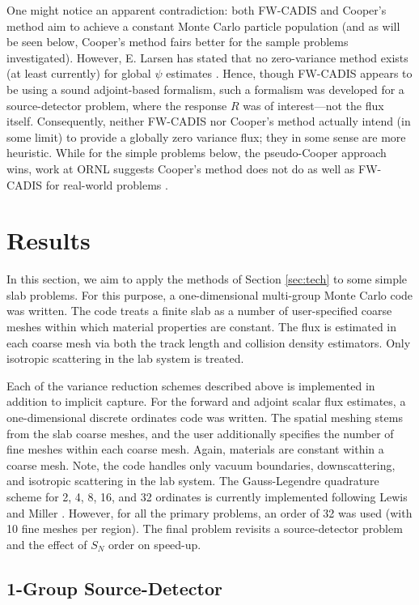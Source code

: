One might notice an apparent contradiction: both FW-CADIS and Cooper's method
aim to achieve a constant Monte Carlo particle population (and as will be seen
below, Cooper's method fairs better for the sample problems investigated). 
However, E. Larsen has stated that no zero-variance method exists (at least
currently) for global $\psi$ estimates \cite{larsen2007hmc}.  Hence, though
FW-CADIS appears to be using a sound adjoint-based formalism, such a formalism
was developed for a source-detector problem, where the response $R$ was of
interest---not the flux itself.  Consequently, neither FW-CADIS nor Cooper's
method actually intend (in some limit) to provide a globally zero variance flux;
they in some sense are more heuristic.  While for the simple problems below, the
pseudo-Cooper approach wins, work at ORNL suggests Cooper's method does not do
as well as FW-CADIS for real-world problems \cite{wagner2009fwc}.

\section{Results}
\label{sec:results}
In this section, we aim to apply the methods of Section \ref{sec:tech} to some
simple slab problems.  For this purpose, a one-dimensional multi-group Monte
Carlo code was written.  The code treats a finite slab as a number of
user-specified coarse meshes within which material properties are constant.  The
flux is estimated in each coarse mesh via both the track length and collision
density estimators.  Only isotropic scattering in the lab system is treated.

Each of the variance reduction schemes described above is implemented in
addition to implicit capture.  For the forward and adjoint scalar flux
estimates, a one-dimensional discrete ordinates code was written.  The spatial
meshing stems from the slab coarse meshes, and the user additionally specifies
the number of fine meshes within each coarse mesh.  Again, materials are
constant within a coarse mesh.  Note, the code handles only vacuum boundaries,
downscattering, and isotropic scattering in the lab system.  The Gauss-Legendre
quadrature scheme for 2, 4, 8, 16, and 32 ordinates is currently implemented
following Lewis and Miller \cite{lewis1993cmn}.  However, for all the primary
problems, an order of 32 was used (with 10 fine meshes per region).  The final
problem revisits a source-detector problem and the effect of $S_N$ order on
speed-up.

\subsection{1-Group Source-Detector}

